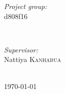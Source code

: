 \begin{titlepage}
\begin{minipage}{0.4\textwidth}
\begin{flushleft}
\emph{Project group:}\\
d808f16


\end{flushleft}
\end{minipage}
~
\begin{minipage}{0.4\textwidth}
\begin{flushright} \large
\emph{Supervisor:} \\
Nattiya  \textsc{Kanhabua} %
\end{flushright}
\end{minipage}\\[4cm]



{\large \today}\\[3cm] %

 

\vfill %

\end{titlepage}